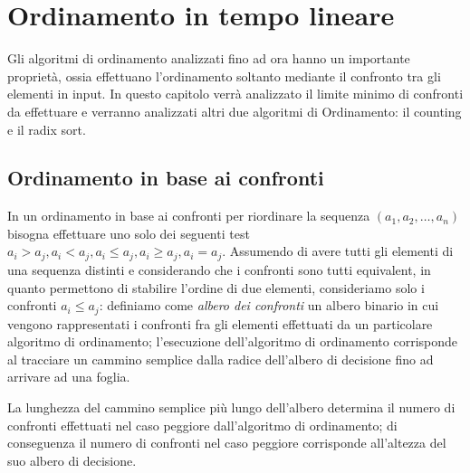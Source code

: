 \chapter{Ordinamento in tempo lineare}
Gli algoritmi di ordinamento analizzati fino ad ora hanno un importante proprietà,
ossia effettuano l'ordinamento soltanto mediante il confronto tra gli elementi in input.
In questo capitolo verrà analizzato il limite minimo di confronti da effettuare e
verranno analizzati altri due algoritmi di Ordinamento: il counting e il radix sort.

\section{Ordinamento in base ai confronti}
In un ordinamento in base ai confronti per riordinare la sequenza $(a_1,a_2,\dots,a_n)$
bisogna effettuare uno solo dei seguenti test $a_i > a_j,a_i < a_j,a_i \leq a_j,a_i \geq a_j,a_i = a_j$.
Assumendo di avere tutti gli elementi di una sequenza distinti e considerando che i confronti
sono tutti equivalent, in quanto permettono di stabilire l'ordine di due elementi,
consideriamo solo i confronti $a_i \leq a_j$:
definiamo come \emph{albero dei confronti} un albero binario in cui vengono rappresentati
i confronti fra gli elementi effettuati da un particolare algoritmo di ordinamento;
l'esecuzione dell'algoritmo di ordinamento corrisponde al tracciare un cammino semplice
dalla radice dell'albero di decisione fino ad arrivare ad una foglia.


La lunghezza del cammino semplice più lungo dell'albero determina il numero di confronti
effettuati nel caso peggiore dall'algoritmo di ordinamento; di conseguenza il numero
di confronti nel caso peggiore corrisponde all'altezza del suo albero di decisione.

